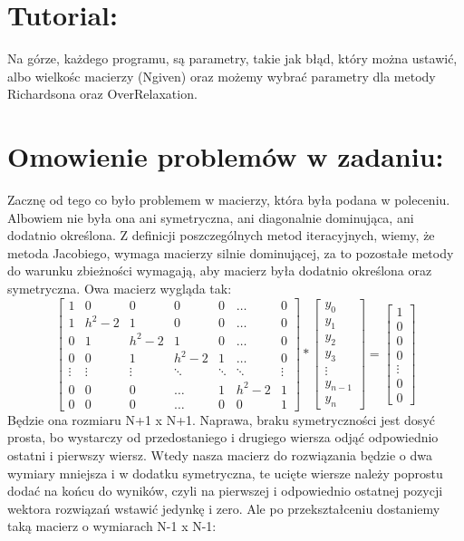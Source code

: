 \documentclass[12pt]{article}
\begin{document}
\section{Tutorial:}
Na górze, każdego programu, są parametry, takie jak błąd, który można ustawić, albo wielkośc macierzy (Ngiven) oraz możemy wybrać parametry dla metody Richardsona oraz OverRelaxation. 
\section{Omowienie problemów w zadaniu:}
Zacznę od tego co było problemem w macierzy, która była podana w poleceniu. Albowiem nie była ona ani symetryczna, ani diagonalnie dominująca, ani dodatnio określona. Z definicji poszczególnych metod iteracyjnych, wiemy, że metoda Jacobiego, wymaga macierzy silnie dominującej, za to pozostałe metody do warunku zbieżności wymagają, aby macierz była dodatnio określona oraz symetryczna. Owa macierz wygląda tak:
\[
\begin{bmatrix}
    1 & 0 & 0 & 0 & 0 & \dots & 0\\
    1 & h^{2}-2 & 1 & 0 & 0 & \dots & 0\\ 
    0 & 1 & h^{2}-2 & 1 & 0 & \dots & 0\\
    0 & 0 & 1 & h^{2}-2 & 1 &\dots & 0\\
    \vdots & \vdots & \vdots & \ddots & \ddots & \ddots & \vdots\\
    0 & 0 & 0 & \hdots & 1 & h^{2}-2 & 1\\
    0 & 0 & 0 & \hdots & 0 & 0 & 1
\end{bmatrix}
*
\begin{bmatrix}
    y_{0}\\
    y_{1}\\
    y_{2}\\
    y_{3}\\
    \vdots\\
    y_{n-1}\\
    y_{n}
\end{bmatrix}
=
\begin{bmatrix}
    1\\
    0\\
    0\\
    0\\
    \vdots\\
    0\\
    0
\end{bmatrix}
\]
Będzie ona rozmiaru N+1 x N+1. Naprawa, braku symetryczności jest dosyć prosta, bo wystarczy od przedostaniego i drugiego wiersza odjąć odpowiednio ostatni i pierwszy wiersz. Wtedy nasza macierz do rozwiązania będzie o dwa wymiary mniejsza i w dodatku symetryczna, te ucięte wiersze należy poprostu dodać na końcu do wyników, czyli na pierwszej i odpowiednio ostatnej pozycji wektora rozwiązań wstawić jedynkę i zero. Ale po przekształceniu dostaniemy taką macierz o wymiarach N-1 x N-1:
\end{document}

